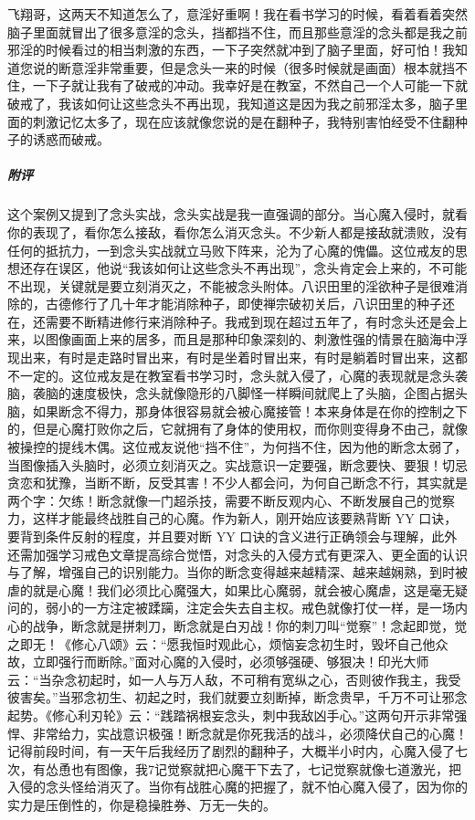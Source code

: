\begin{case}
    飞翔哥，这两天不知道怎么了，意淫好重啊！我在看书学习的时候，看着看着突然脑子里面就冒出了很多意淫的念头，挡都挡不住，而且那些意淫的念头都是我之前邪淫的时候看过的相当刺激的东西，一下子突然就冲到了脑子里面，好可怕！我知道您说的断意淫非常重要，但是念头一来的时候（很多时候就是画面）根本就挡不住，一下子就让我有了破戒的冲动。我幸好是在教室，不然自己一个人可能一下就破戒了，我该如何让这些念头不再出现，我知道这是因为我之前邪淫太多，脑子里面的刺激记忆太多了，现在应该就像您说的是在翻种子，我特别害怕经受不住翻种子的诱惑而破戒。
    \subparagraph{附评} 这个案例又提到了念头实战，念头实战是我一直强调的部分。当心魔入侵时，就看你的表现了，看你怎么接敌，看你怎么消灭念头。不少新人都是接敌就溃败，没有任何的抵抗力，一到念头实战就立马败下阵来，沦为了心魔的傀儡。这位戒友的思想还存在误区，他说“我该如何让这些念头不再出现”，念头肯定会上来的，不可能不出现，关键就是要立刻消灭之，不能被念头附体。八识田里的淫欲种子是很难消除的，古德修行了几十年才能消除种子，即使禅宗破初关后，八识田里的种子还在，还需要不断精进修行来消除种子。我戒到现在超过五年了，有时念头还是会上来，以图像画面上来的居多，而且是那种印象深刻的、刺激性强的情景在脑海中浮现出来，有时是走路时冒出来，有时是坐着时冒出来，有时是躺着时冒出来，这都不一定的。这位戒友是在教室看书学习时，念头就入侵了，心魔的表现就是念头袭脑，袭脑的速度极快，念头就像隐形的八脚怪一样瞬间就爬上了头脑，企图占据头脑，如果断念不得力，那身体很容易就会被心魔接管！本来身体是在你的控制之下的，但是心魔打败你之后，它就拥有了身体的使用权，而你则变得身不由己，就像被操控的提线木偶。这位戒友说他“挡不住”，为何挡不住，因为他的断念太弱了，当图像插入头脑时，必须立刻消灭之。实战意识一定要强，断念要快、要狠！切忌贪恋和犹豫，当断不断，反受其害！不少人都会问，为何自己断念不行，其实就是两个字：欠练！断念就像一门超杀技，需要不断反观内心、不断发展自己的觉察力，这样才能最终战胜自己的心魔。作为新人，刚开始应该要熟背断 YY 口诀，要背到条件反射的程度，并且要对断 YY 口诀的含义进行正确领会与理解，此外还需加强学习戒色文章提高综合觉悟，对念头的入侵方式有更深入、更全面的认识与了解，增强自己的识别能力。当你的断念变得越来越精深、越来越娴熟，到时被虐的就是心魔！我们必须比心魔强大，如果比心魔弱，就会被心魔虐，这是毫无疑问的，弱小的一方注定被蹂躏，注定会失去自主权。戒色就像打仗一样，是一场内心的战争，断念就是拼刺刀，断念就是白刃战！你的刺刀叫“觉察”！念起即觉，觉之即无！《修心八颂》云：“愿我恒时观此心，烦恼妄念初生时，毁坏自己他众故，立即强行而断除。”面对心魔的入侵时，必须够强硬、够狠决！印光大师云：“当杂念初起时，如一人与万人敌，不可稍有宽纵之心，否则彼作我主，我受彼害矣。”当邪念初生、初起之时，我们就要立刻断掉，断念贵早，千万不可让邪念起势。《修心利刃轮》云：“践踏祸根妄念头，刺中我敌凶手心。”这两句开示非常强悍、非常给力，实战意识极强！断念就是你死我活的战斗，必须降伏自己的心魔！记得前段时间，有一天午后我经历了剧烈的翻种子，大概半小时内，心魔入侵了七次，有怂恿也有图像，我7记觉察就把心魔干下去了，七记觉察就像七道激光，把入侵的念头怪给消灭了。当你有战胜心魔的把握了，就不怕心魔入侵了，因为你的实力是压倒性的，你是稳操胜券、万无一失的。
\end{case}


